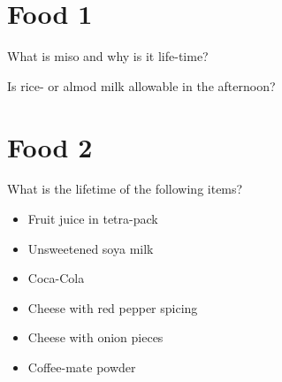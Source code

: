 \section{Food 1}

What is miso and why is it life-time?

Is rice- or almod milk allowable in the afternoon?

\section{Food 2}

What is the lifetime of the following items?

\begin{itemize}
\tightlist
\item
  Fruit juice in tetra-pack
\item
  Unsweetened soya milk
\item
  Coca-Cola
\item
  Cheese with red pepper spicing
\item
  Cheese with onion pieces
\item
  Coffee-mate powder
\end{itemize}

